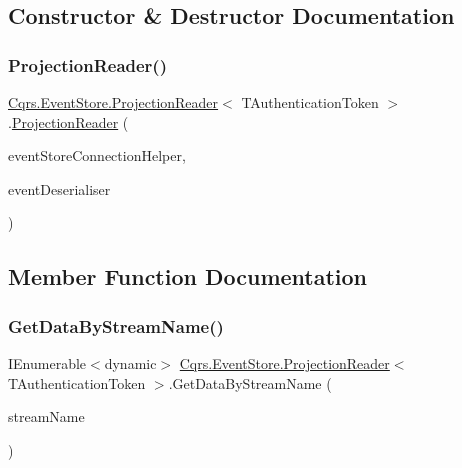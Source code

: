 \subsection{Constructor \& Destructor Documentation}
\mbox{\label{classCqrs_1_1EventStore_1_1ProjectionReader_a87d5f996f75577bb6ae18704c9a590a2}} 
\subsubsection{\texorpdfstring{Projection\+Reader()}{ProjectionReader()}}
{\footnotesize\ttfamily \hyperlink{classCqrs_1_1EventStore_1_1ProjectionReader}{Cqrs.\+Event\+Store.\+Projection\+Reader}$<$ T\+Authentication\+Token $>$.\hyperlink{classCqrs_1_1EventStore_1_1ProjectionReader}{Projection\+Reader} (\begin{DoxyParamCaption}\item[{\hyperlink{interfaceCqrs_1_1EventStore_1_1IEventStoreConnectionHelper}{I\+Event\+Store\+Connection\+Helper}}]{event\+Store\+Connection\+Helper,  }\item[{\hyperlink{interfaceCqrs_1_1EventStore_1_1IEventDeserialiser}{I\+Event\+Deserialiser}$<$ T\+Authentication\+Token $>$}]{event\+Deserialiser }\end{DoxyParamCaption})\hspace{0.3cm}{\ttfamily [protected]}}



\subsection{Member Function Documentation}
\mbox{\label{classCqrs_1_1EventStore_1_1ProjectionReader_adcc229abde429acfa6b125b3a93a85b4}} 
\subsubsection{\texorpdfstring{Get\+Data\+By\+Stream\+Name()}{GetDataByStreamName()}}
{\footnotesize\ttfamily I\+Enumerable$<$dynamic$>$ \hyperlink{classCqrs_1_1EventStore_1_1ProjectionReader}{Cqrs.\+Event\+Store.\+Projection\+Reader}$<$ T\+Authentication\+Token $>$.Get\+Data\+By\+Stream\+Name (\begin{DoxyParamCaption}\item[{string}]{stream\+Name }\end{DoxyParamCaption})\hspace{0.3cm}{\ttfamily [protected]}}

